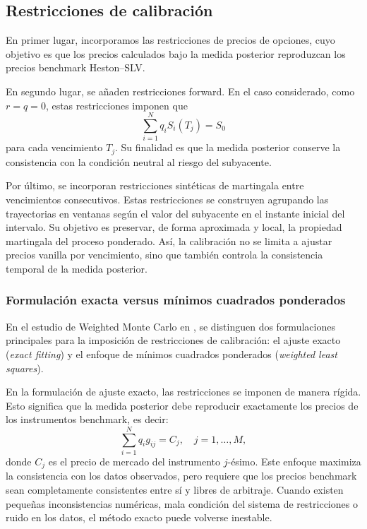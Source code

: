 %
\subsection{Restricciones de calibración}

 En primer lugar, incorporamos las restricciones de precios de opciones, cuyo objetivo es que los precios calculados bajo la medida posterior reproduzcan los precios benchmark Heston--SLV.

En segundo lugar, se añaden restricciones forward. En el caso considerado, como \(r=q=0\), estas restricciones imponen que
\[
\sum_{i=1}^{N} q_i S_i(T_j)=S_0
\]
para cada vencimiento \(T_j\). Su finalidad es que la medida posterior conserve la consistencia con la condición neutral al riesgo del subyacente.

Por último, se incorporan restricciones sintéticas de martingala entre vencimientos consecutivos. Estas restricciones se construyen agrupando las trayectorias en ventanas según el valor del subyacente en el instante inicial del intervalo. Su objetivo es preservar, de forma aproximada y local, la propiedad martingala del proceso ponderado. Así, la calibración no se limita a ajustar precios vanilla por vencimiento, sino que también controla la consistencia temporal de la medida posterior.

\subsubsection{Formulación exacta versus mínimos cuadrados ponderados}

En el estudio de Weighted Monte Carlo en \cite{articleAvellaneda, articleElices}, se distinguen dos formulaciones principales para la imposición de restricciones de calibración: el ajuste exacto (\textit{exact fitting}) y el enfoque de mínimos cuadrados ponderados (\textit{weighted least squares}).

En la formulación de ajuste exacto, las restricciones se imponen de manera rígida. Esto significa que la medida posterior debe reproducir exactamente los precios de los instrumentos benchmark, es decir:
\[
\sum_{i=1}^{N} q_i g_{ij} = C_j, \quad j = 1,\ldots,M,
\]
donde \(C_j\) es el precio de mercado del instrumento \(j\)-ésimo. Este enfoque maximiza la consistencia con los datos observados, pero requiere que los precios benchmark sean completamente consistentes entre sí y libres de arbitraje. Cuando existen pequeñas inconsistencias numéricas, mala condición del sistema de restricciones o ruido en los datos, el método exacto puede volverse inestable.

